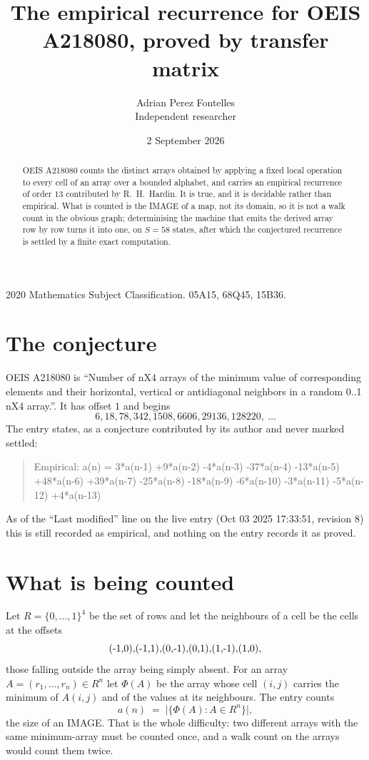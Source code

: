 \documentclass[11pt,a4paper]{article}
\title{The empirical recurrence for OEIS A218080, proved by transfer matrix}
\author{Adrian Perez Fontelles\\ \small Independent researcher}
\date{2 September 2026}
\theoremstyle{plain}
\theoremstyle{definition}
\begin{document}
\maketitle

\begin{abstract}
OEIS A218080 counts the distinct arrays obtained by applying a fixed local operation to every cell
of an array over a bounded alphabet, and carries an empirical recurrence of order $13$
contributed by R.~H.~Hardin. It is true, and it is decidable rather than empirical. What is
counted is the IMAGE of a map, not its domain, so it is not a walk count in the obvious graph;
determinising the machine that emits the derived array row by row turns it into one, on
$S=58$ states, after which the conjectured recurrence is settled by a finite exact
computation.
\end{abstract}

\noindent\small 2020 Mathematics Subject Classification. 05A15, 68Q45, 15B36.\normalsize

\section{The conjecture}

OEIS A218080 is ``Number of nX4 arrays of the minimum value of corresponding elements and their horizontal, vertical or antidiagonal neighbors in a random 0..1 nX4 array.''. It has offset $1$ and begins
\[
6, 18, 78, 342, 1508, 6606, 29136, 128220,\ \dots
\]
The entry states, as a conjecture contributed by its author and never marked settled:
\begin{quote}
Empirical: a(n) = 3*a(n-1) +9*a(n-2) -4*a(n-3) -37*a(n-4) -13*a(n-5) +48*a(n-6) +39*a(n-7) -25*a(n-8) -18*a(n-9) -6*a(n-10) -3*a(n-11) -5*a(n-12) +4*a(n-13)
\end{quote}
As of the ``Last modified'' line on the live entry (Oct 03 2025 17:33:51, revision 8) this is still
recorded as empirical, and nothing on the entry records it as proved.

\section{What is being counted}

Let $R=\{0,\dots,1\}^{4}$ be the set of rows and let the neighbours of
a cell be the cells at the offsets
\[
$(-1,0)$, $(-1,1)$, $(0,-1)$, $(0,1)$, $(1,-1)$, $(1,0)$,
\]
those falling outside the array being simply absent. For an array
$A=(r_1,\dots,r_n)\in R^n$ let $\Phi(A)$ be the array whose cell $(i,j)$ carries the
minimum of $A(i,j)$ and of the values at its neighbours. The entry counts
\[
a(n)\;=\;\bigl|\{\Phi(A):A\in R^n\}\bigr| ,
\]
the size of an IMAGE. That is the whole difficulty: two different arrays with the same
minimum-array must be counted once, and a walk count on the arrays would count them twice.
\end{document}
